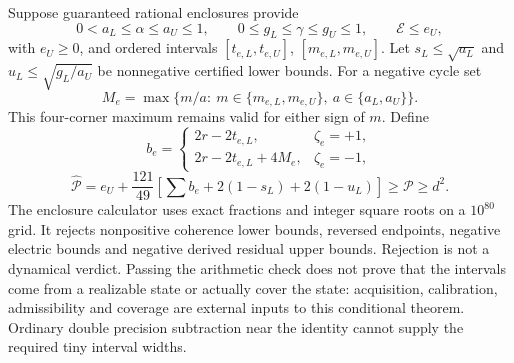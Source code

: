 \documentclass[11pt,a4paper]{article}
\begin{document}
Suppose guaranteed rational enclosures provide
\[
0<a_L\le\alpha\le a_U\le1,\qquad
0\le g_L\le\gamma\le g_U\le1,\qquad\mathcal E\le e_U,
\]
with $e_U\ge0$, and ordered intervals $[t_{e,L},t_{e,U}]$, $[m_{e,L},m_{e,U}]$. Let $s_L\le\sqrt{a_L}$ and $u_L\le\sqrt{g_L/a_U}$ be nonnegative certified lower bounds. For a negative cycle set
\[
M_e=\max\{m/a:\ m\in\{m_{e,L},m_{e,U}\},\ a\in\{a_L,a_U\}\}.
\]
This four-corner maximum remains valid for either sign of $m$. Define
\[
b_e=\begin{cases}2r-2t_{e,L},&\zeta_e=+1,\\
2r-2t_{e,L}+4M_e,&\zeta_e=-1,\end{cases}
\]
\[
\boxed{\widehat{\mathcal P}=e_U+\frac{121}{49}
\left[\sum b_e+2(1-s_L)+2(1-u_L)\right]\ge\mathcal P\ge d^2.}
\]
The enclosure calculator uses exact fractions and integer square roots on a $10^{80}$ grid. It rejects nonpositive coherence lower bounds, reversed endpoints, negative electric bounds and negative derived residual upper bounds. Rejection is not a dynamical verdict. Passing the arithmetic check does not prove that the intervals come from a realizable state or actually cover the state: acquisition, calibration, admissibility and coverage are external inputs to this conditional theorem. Ordinary double precision subtraction near the identity cannot supply the required tiny interval widths.
\newpage
\end{document}
